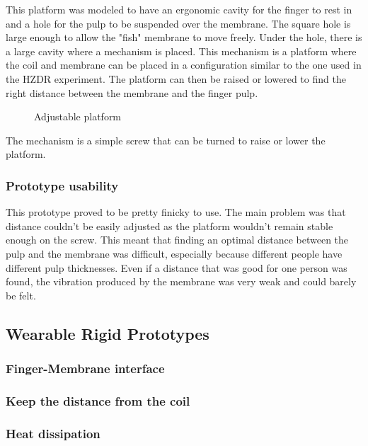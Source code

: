 This platform was modeled to have an ergonomic cavity for the finger to rest in and a hole for the pulp to be suspended over the membrane.
The square hole is large enough to allow the "fish" membrane to move freely.
Under the hole, there is a large cavity where a mechanism is placed.
This mechanism is a platform where the coil and membrane can be placed in a configuration similar to the one used in the HZDR experiment.
The platform can then be raised or lowered to find the right distance between the membrane and the finger pulp.
\begin{figure}
    \centering
    \caption{Adjustable platform}
    \label{fig: adj_platform}
\end{figure}
The mechanism is a simple screw that can be turned to raise or lower the platform.

\subsubsection{Prototype usability}
This prototype proved to be pretty finicky to use.
The main problem was that distance couldn't be easily adjusted as the platform wouldn't remain stable enough on the screw.
This meant that finding an optimal distance between the pulp and the membrane was difficult, especially because different people have different pulp thicknesses.
Even if a distance that was good for one person was found, the vibration produced by the membrane was very weak and could barely be felt.

\subsection{Wearable Rigid Prototypes}

\subsubsection{Finger-Membrane interface}

\subsubsection{Keep the distance from the coil}

\subsubsection{Heat dissipation}

